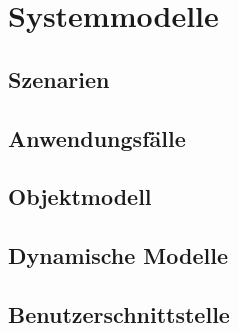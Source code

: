\section{Systemmodelle}

\subsection{Szenarien}
\subsection{Anwendungsfälle}
\subsection{Objektmodell}
\subsection{Dynamische Modelle}
\subsection{Benutzerschnittstelle}
